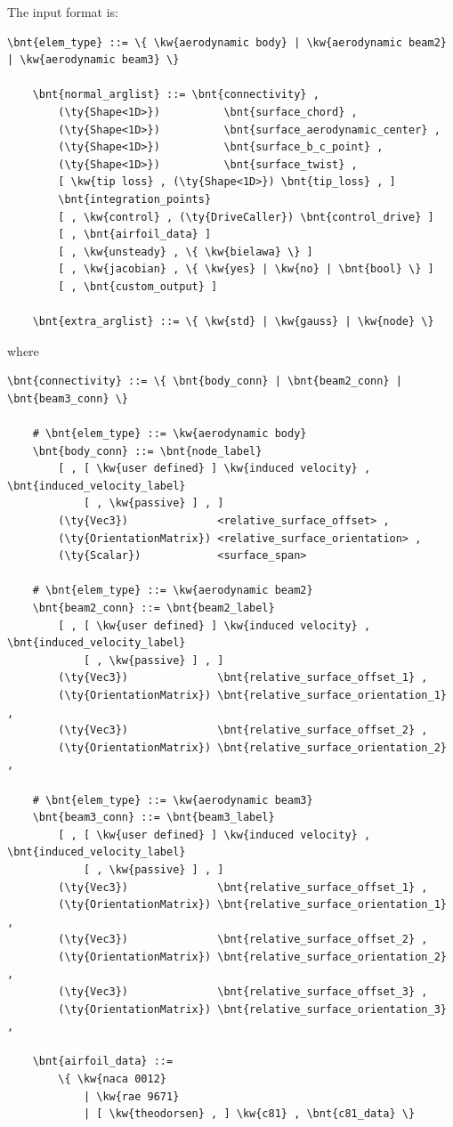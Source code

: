 The input format is:
\begin{Verbatim}[commandchars=\\\{\}]
    \bnt{elem_type} ::= \{ \kw{aerodynamic body} | \kw{aerodynamic beam2} | \kw{aerodynamic beam3} \}

    \bnt{normal_arglist} ::= \bnt{connectivity} ,
        (\ty{Shape<1D>})          \bnt{surface_chord} ,
        (\ty{Shape<1D>})          \bnt{surface_aerodynamic_center} ,
        (\ty{Shape<1D>})          \bnt{surface_b_c_point} ,
        (\ty{Shape<1D>})          \bnt{surface_twist} ,
        [ \kw{tip loss} , (\ty{Shape<1D>}) \bnt{tip_loss} , ]
        \bnt{integration_points}
        [ , \kw{control} , (\ty{DriveCaller}) \bnt{control_drive} ] 
        [ , \bnt{airfoil_data} ]
        [ , \kw{unsteady} , \{ \kw{bielawa} \} ]
        [ , \kw{jacobian} , \{ \kw{yes} | \kw{no} | \bnt{bool} \} ]
        [ , \bnt{custom_output} ]

    \bnt{extra_arglist} ::= \{ \kw{std} | \kw{gauss} | \kw{node} \}
\end{Verbatim}
where
\begin{Verbatim}[commandchars=\\\{\}]
    \bnt{connectivity} ::= \{ \bnt{body_conn} | \bnt{beam2_conn} | \bnt{beam3_conn} \}

    # \bnt{elem_type} ::= \kw{aerodynamic body}
    \bnt{body_conn} ::= \bnt{node_label}
        [ , [ \kw{user defined} ] \kw{induced velocity} , \bnt{induced_velocity_label}
            [ , \kw{passive} ] , ] 
        (\ty{Vec3})              <relative_surface_offset> , 
        (\ty{OrientationMatrix}) <relative_surface_orientation> ,
        (\ty{Scalar})            <surface_span>

    # \bnt{elem_type} ::= \kw{aerodynamic beam2}
    \bnt{beam2_conn} ::= \bnt{beam2_label}
        [ , [ \kw{user defined} ] \kw{induced velocity} , \bnt{induced_velocity_label}
            [ , \kw{passive} ] , ] 
        (\ty{Vec3})              \bnt{relative_surface_offset_1} ,
        (\ty{OrientationMatrix}) \bnt{relative_surface_orientation_1} ,
        (\ty{Vec3})              \bnt{relative_surface_offset_2} ,
        (\ty{OrientationMatrix}) \bnt{relative_surface_orientation_2} ,

    # \bnt{elem_type} ::= \kw{aerodynamic beam3}
    \bnt{beam3_conn} ::= \bnt{beam3_label} 
        [ , [ \kw{user defined} ] \kw{induced velocity} , \bnt{induced_velocity_label}
            [ , \kw{passive} ] , ] 
        (\ty{Vec3})              \bnt{relative_surface_offset_1} ,
        (\ty{OrientationMatrix}) \bnt{relative_surface_orientation_1} ,
        (\ty{Vec3})              \bnt{relative_surface_offset_2} ,
        (\ty{OrientationMatrix}) \bnt{relative_surface_orientation_2} ,
        (\ty{Vec3})              \bnt{relative_surface_offset_3} ,       
        (\ty{OrientationMatrix}) \bnt{relative_surface_orientation_3} ,

    \bnt{airfoil_data} ::=
        \{ \kw{naca 0012}
            | \kw{rae 9671}
            | [ \kw{theodorsen} , ] \kw{c81} , \bnt{c81_data} \}
\end{Verbatim}
